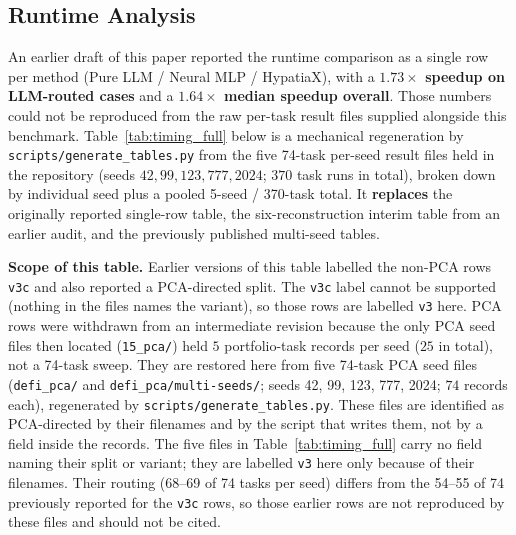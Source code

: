 \documentclass[twoside,11pt]{article}
\begin{document}
\subsection{Runtime Analysis}\label{subsec:runtime-analysis}
\label{sec:timing}

An earlier draft of this paper reported the runtime comparison as a single
row per method (Pure LLM / Neural MLP / HypatiaX), with a
\textbf{$1.73\times$ speedup on LLM-routed cases} and a
\textbf{$1.64\times$ median speedup overall}. Those numbers could not be
reproduced from the raw per-task result files supplied alongside this
benchmark. Table~\ref{tab:timing_full} below is a mechanical regeneration
by \texttt{scripts/generate\_tables.py} from the five 74-task per-seed result
files held in the repository (seeds $42, 99, 123, 777, 2024$; $370$ task runs
in total), broken down by individual seed plus a pooled 5-seed / 370-task
total. It \textbf{replaces} the originally reported single-row table, the
six-reconstruction interim table from an earlier audit, and the previously
published multi-seed tables.

\textbf{Scope of this table.} Earlier versions of this table labelled the
non-PCA rows \texttt{v3c} and also reported a PCA-directed split. The \texttt{v3c}
label cannot be supported (nothing in the files names the variant), so those rows are
labelled \texttt{v3} here. PCA rows were withdrawn from an intermediate revision
because the only PCA seed files then located (\texttt{15\_pca/}) held $5$
portfolio-task records per seed ($25$ in total), not a 74-task sweep. They are restored here
from five 74-task PCA seed files (\texttt{defi\_pca/} and \texttt{defi\_pca/multi-seeds/};
seeds 42, 99, 123, 777, 2024; $74$ records each), regenerated by
\texttt{scripts/generate\_tables.py}. These files are identified as PCA-directed by their
filenames and by the script that writes them, not by a field inside the records. The five
files in Table~\ref{tab:timing_full} carry no field naming their split or
variant; they are labelled \texttt{v3} here only because of their filenames.
Their routing (68--69 of 74 tasks per seed) differs from the 54--55 of 74
previously reported for the \texttt{v3c} rows, so those earlier rows are not
reproduced by these files and should not be cited.
\end{document}
